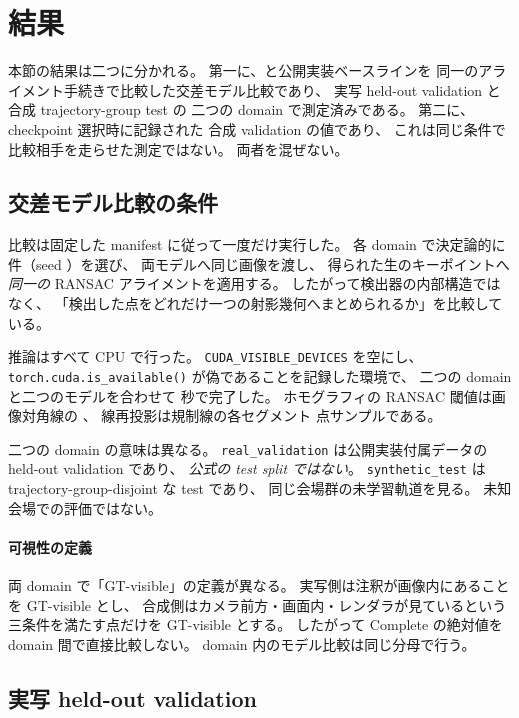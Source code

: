 \section{結果}
\label{sec:results}

本節の結果は二つに分かれる。
第一に、\Method と公開実装ベースラインを
同一のアライメント手続きで比較した交差モデル比較であり、
実写 held-out validation と合成 trajectory-group test の
二つの domain で測定済みである。
第二に、checkpoint 選択時に記録された
合成 validation の値であり、
これは同じ条件で比較相手を走らせた測定ではない。
両者を混ぜない。

\subsection{交差モデル比較の条件}
\label{sec:comparison_setup}

比較は固定した manifest に従って一度だけ実行した。
各 domain で決定論的に \resBenchDomainSamples 件（seed \resBenchSeed）を選び、
両モデルへ同じ画像を渡し、
得られた生のキーポイントへ\emph{同一の} RANSAC アライメントを適用する。
したがって検出器の内部構造ではなく、
「検出した点をどれだけ一つの射影幾何へまとめられるか」を比較している。

推論はすべて CPU で行った。
\texttt{CUDA\_VISIBLE\_DEVICES} を空にし、
\texttt{torch.cuda.is\_available()} が偽であることを記録した環境で、
二つの domain と二つのモデルを合わせて \resBenchElapsedSeconds 秒で完了した。
ホモグラフィの RANSAC 閾値は画像対角線の \resBenchRansacThreshold、
線再投影は規制線の各セグメント \resBenchLineSegmentSamples 点サンプルである。

二つの domain の意味は異なる。
\texttt{real\_validation} は公開実装付属データの held-out validation であり、
\emph{公式の test split ではない}。
\texttt{synthetic\_test} は trajectory-group-disjoint な test であり、
同じ会場群の未学習軌道を見る。
未知会場での評価ではない。

\paragraph{可視性の定義}
両 domain で「GT-visible」の定義が異なる。
実写側は注釈が画像内にあることを GT-visible とし、
合成側はカメラ前方・画面内・レンダラが見ているという三条件を満たす点だけを
GT-visible とする。
したがって Complete の絶対値を domain 間で直接比較しない。
domain 内のモデル比較は同じ分母で行う。

\subsection{実写 held-out validation}
\label{sec:results_real}

